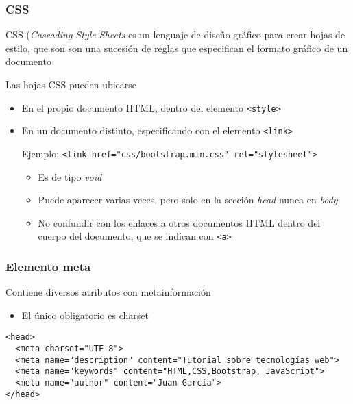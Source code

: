 \documentclass[ucs]{beamer}
\begin{document}
\begin{frame}[fragile]
\frametitle{CSS}


CSS
(\emph{Cascading Style Sheets} 
es un lenguaje de diseño gráfico para crear hojas de estilo,
que son son una sucesión de reglas que especifican
el formato gráfico de un documento

Las hojas CSS pueden ubicarse

    \begin{itemize}
    \item
En el propio documento HTML, dentro del elemento 
\verb|<style>|
    \item
En un documento distinto, especificando con el elemento
\verb|<link>|

Ejemplo:
\verb|<link href="css/bootstrap.min.css" rel="stylesheet">|

    \begin{itemize}
\item
Es de tipo
\emph{void}

    \item
Puede aparecer varias veces, pero solo en la sección
\emph{head}
nunca en
\emph{body}


    \item
No confundir con los enlaces a otros documentos HTML dentro del cuerpo del documento, que se 
indican con \verb|<a>|
    \end{itemize}

    \end{itemize}


\end{frame}




\begin{frame}[fragile]
\frametitle{Elemento meta}

Contiene diversos atributos con metainformación

    \begin{itemize}
    \item
El único obligatorio es charset
    \end{itemize}

  \begin{footnotesize}
  \begin{verbatim}
<head>
  <meta charset="UTF-8">
  <meta name="description" content="Tutorial sobre tecnologías web">
  <meta name="keywords" content="HTML,CSS,Bootstrap, JavaScript">
  <meta name="author" content="Juan García">
</head>
  \end{verbatim}
  \end{footnotesize}



\end{frame}
\end{document}
